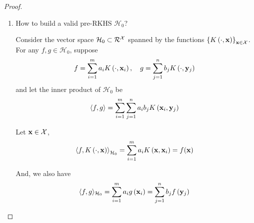 \begin{proof}
	\begin{enumerate}
		\item How to build a valid pre-RKHS $\mathcal{H}_{0}$?

		      Consider the vector space $\mathcal{H}_{0}\subset\mathcal{R}^{{\mathcal X}}$ spanned by the functions $\left\{K\left(\cdot,{\bf x}\right)\right\}_{{\bf x}\in{\mathcal X}}$. For any $f,g\in\mathcal{H}_{0}$, suppose
		      \begin{equation*}
			      f=\sum_{i=1}^{m}a_{i}K\left(\cdot,{\bf x}_{i}\right),\quad g=\sum_{j=1}^{n}b_{j}K\left(\cdot,\mathbf{y}_{j}\right)
		      \end{equation*}
		      and let the inner product of $\mathcal{H}_{0}$ be
		      \begin{equation}
			      \left\langle f,g\right\rangle=\sum_{i=1}^{m}\sum_{j=1}^{n}a_{i}b_{j}K\left({\bf x}_{i},\mathbf{y}_{j}\right)
			      \label{eq:definition-pre-rkhs-inner-product}
		      \end{equation}

		      Let ${\bf x}\in{\mathcal X}$,
		      \begin{equation*}
			      \left\langle f,K\left(\cdot,{\bf x}\right)\right\rangle_{\mathcal{H}_{0}}=\sum_{i=1}^{m}a_{i} K\left({\bf x},{\bf x}_{i}\right)=f({\bf x})
			      \label{eq:reproducing-kernel}
		      \end{equation*}

		      And, we also have
		      \begin{equation*}
			      \langle f, g\rangle_{\mathcal{H}_{0}}=\sum_{i=1}^{m} a_{i} g\left({\bf x}_{i}\right)=\sum_{j=1}^{n} b_{j} f\left(\mathbf{y}_{j}\right)
		      \end{equation*}


\end{enumerate}
\end{proof}
